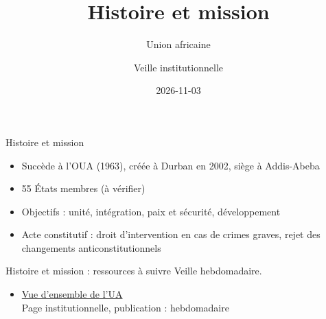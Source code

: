 \documentclass[aspectratio=169,11pt]{beamer}
\title{Histoire et mission}
\subtitle{Union africaine}
\author{Veille institutionnelle}
\date{2026-11-03}
\begin{document}
\begin{frame}\titlepage\end{frame}

\begin{frame}{Histoire et mission}
\begin{itemize}
\item Succède à l'OUA (1963), créée à Durban en 2002, siège à Addis-Abeba
\item 55 États membres (à vérifier)
\item Objectifs : unité, intégration, paix et sécurité, développement
\item Acte constitutif : droit d'intervention en cas de crimes graves, rejet des changements anticonstitutionnels
\end{itemize}
\end{frame}

\begin{frame}{Histoire et mission : ressources à suivre}
\small
Veille hebdomadaire.
\begin{itemize}
\item \href{https://au.int/en/overview}{Vue d'ensemble de l'UA}\\{\footnotesize Page institutionnelle, publication : hebdomadaire}
\end{itemize}
\end{frame}
\end{document}
